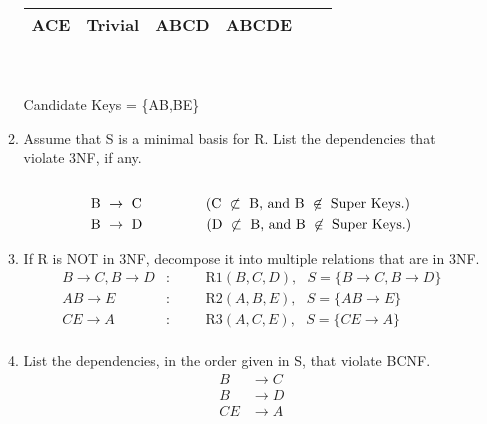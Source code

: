 \documentclass[12pt]{article}
\begin{document}
\begin{enumerate}
\begin{enumerate}
\begin{tabular}[t]{|c|c||c|c||c|c|}
      \hline
      ACE & Trivial & ABCD & ABCDE & & \\
      \hline
    \end{tabular}    
    \\ \\
    Candidate Keys = \{AB,BE\}
  \item Assume that S is a minimal basis for R. List the dependencies that violate 3NF, if any. \\ \\
    \begin{align*}
      \text{B } &\to \text{ C \hspace{1.5 cm}(C } \not\subset \text{ B, and B } \not\in \text{ Super Keys.)} \\
      \text{B } &\to \text{ D \hspace{1.5 cm}(D } \not\subset \text{ B, and B } \not\in \text{ Super Keys.)} \\
    \end{align*}
    
    \newpage
    
  \item If R is NOT in 3NF, decompose it into multiple relations that are in 3NF.
    \begin{align*}
      B \to C, B \to D &: \hspace{1cm} \textrm{R1}(B,C,D), \textrm{  }S=\{B \to C, B \to D\} \\
      AB \to E &: \hspace{1cm} \textrm{R2}(A,B,E),\textrm{  } S=\{AB \to E\} \\
      CE \to A &: \hspace{1cm} \textrm{R3}(A,C,E), \textrm{  } S=\{CE \to A\} \\
    \end{align*}

  \item List the dependencies, in the order given in S, that violate BCNF. 
    \begin{align*}
      B &\to C \\
      B &\to D \\
      CE &\to A \\
    \end{align*}
    

\end{enumerate}
\end{enumerate}
\end{document}
